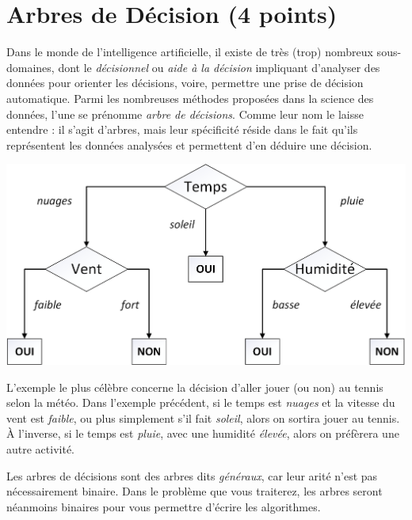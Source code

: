\documentclass[11pt,a4paper]{article}
\begin{document}
\section{Arbres de Décision (4 points) }


\noindent Dans le monde de l'intelligence artificielle, il existe de très (trop) nombreux sous-domaines, dont le \textit{décisionnel} ou \textit{aide à la décision} impliquant d'analyser des données pour orienter les décisions, voire, permettre une prise de décision automatique.
Parmi les nombreuses méthodes proposées dans la science des données, l'une se prénomme \textit{arbre de décisions}.
Comme leur nom le laisse entendre : il s'agit d'arbres, mais leur spécificité réside dans le fait qu'ils représentent les données analysées et permettent d'en déduire une décision.

\bigskip

\begin{center}
\includegraphics[scale=0.70]{img/DecisionTree_Tennis_example.png}
\end{center}

\bigskip

\noindent L'exemple le plus célèbre concerne la décision d'aller jouer (ou non) au tennis selon la météo.
Dans l'exemple précédent, si le temps est \textit{nuages} et la vitesse du vent est \textit{faible}, ou plus simplement s'il fait \textit{soleil}, alors on sortira jouer au tennis.
À l'inverse, si le temps est \textit{pluie}, avec une humidité \textit{élevée}, alors on préfèrera une autre activité.

\medskip

\noindent Les arbres de décisions sont des arbres dits \textit{généraux}, car leur arité n'est pas nécessairement binaire.
Dans le problème que vous traiterez, les arbres seront néanmoins binaires pour vous permettre d'écrire les algorithmes.
\end{document}
